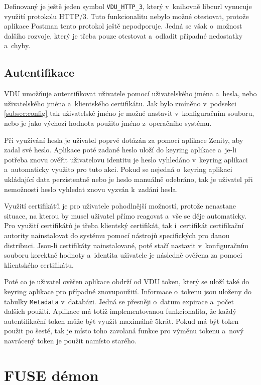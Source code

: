 Definovaný je ještě jeden symbol \texttt{VDU\_HTTP\_3}, který v knihovně libcurl vynucuje využití protokolu HTTP/3. Tuto funkcionalitu nebylo možné otestovat, protože aplikace
Postman tento protokol ještě nepodporuje. Jedná se však o možnost dalšího rozvoje, který je třeba pouze otestovat a odladit případné nedostatky a chyby.

\subsection{Autentifikace}
\label{subsec:authentication}

VDU umožňuje autentifikovat uživatele pomocí uživatelského jména a hesla, nebo uživatelského jména a klientského certifikátu. Jak bylo zmíněno v podsekci \ref{subsec:config}
tak uživatelské jméno je možné nastavit v konfiguračním souboru, nebo je jako výchozí hodnota použito jméno z operačního systému.

Při využívání hesla je uživatel poprvé dotázán za pomocí aplikace Zenity, aby zadal své heslo. Aplikace poté zadané heslo uloží do keyring aplikace a je-li potřeba znovu ověřit
uživatelovu identitu je heslo vyhledáno v keyring aplikaci a automaticky využito pro tuto akci. Pokud se nejedná o keyring aplikaci ukládající data perzistentně nebo je
heslo manuálně odebráno, tak je uživatel při nemožnosti heslo vyhledat znovu vyzván k zadání hesla.

Využití certifikátů je pro uživatele pohodlnější možností, protože nenastane situace, na kterou by musel uživatel přímo reagovat a vše se děje automaticky. Pro využití
certifikátů je třeba klientský certifikát, tak i certifikát certifikační autority nainstalovat do systému pomocí nástrojů specifických pro danou distribuci. Jsou-li certifikáty
nainstalované, poté stačí nastavit v konfiguračním souboru korektně hodnoty a identita uživatele je následně ověřena za pomoci klientského certifikátu.

Poté co je uživatel ověřen aplikace obdrží od VDU token, který se uloží také do keyring aplikace pro případné znovupoužití. Informace o tokenu jsou uloženy do 
tabulky \texttt{Metadata} v databázi. Jedná se přesněji o datum expirace a počet dalších použití. Aplikace má totiž implementovanou funkcionalita, že každý autentifikační token
může být využit maximálně 5krát. Pokud má být token použit po šesté, tak je místo toho zavolaná funkce pro výměnu tokenu a nový navrácený token je použit namísto starého.

\section{FUSE démon}

